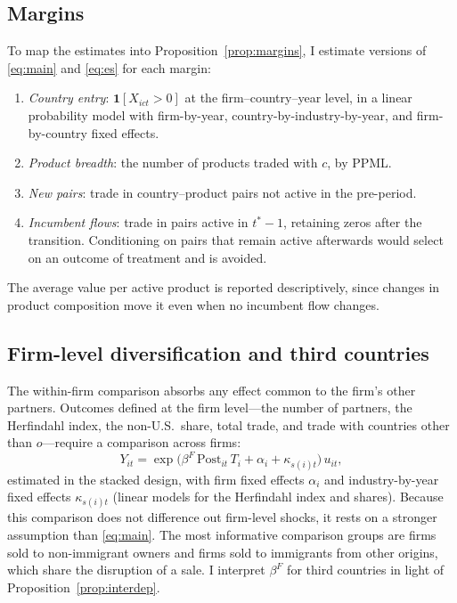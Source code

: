 \documentclass[12pt]{article}
\theoremstyle{remark}
\newcommand{\Post}{\mathrm{Post}}
\newcommand{\one}{\mathbf{1}}
\begin{document}
\subsection{Margins}
\label{sec:margins}

To map the estimates into Proposition~\ref{prop:margins}, I estimate versions
of \eqref{eq:main} and \eqref{eq:es} for each margin:
\begin{enumerate}[label=(\roman*),itemsep=0.1em]
\item \emph{Country entry}: $\one[X_{ict}>0]$ at the firm--country--year level,
in a linear probability model with firm-by-year, country-by-industry-by-year,
and firm-by-country fixed effects.
\item \emph{Product breadth}: the number of products traded with $c$, by
PPML.
\item \emph{New pairs}: trade in country--product pairs not active in the
pre-period.
\item \emph{Incumbent flows}: trade in pairs active in $t^*-1$, retaining zeros
after the transition. Conditioning on pairs that remain active afterwards
would select on an outcome of treatment and is avoided.
\end{enumerate}
The average value per active product is reported descriptively, since
changes in product composition move it even when no incumbent flow changes.

\subsection{Firm-level diversification and third countries}

The within-firm comparison absorbs any effect common to the firm's other
partners. Outcomes defined at the firm level---the number of partners, the
Herfindahl index, the non-U.S.\ share, total trade, and trade with countries
other than $o$---require a comparison across firms:
\begin{equation}
Y_{it} = \exp\big(\beta^{F}\,\Post_{it}\,T_i + \alpha_i + \kappa_{s(i)t}\big)\,u_{it},
\label{eq:firm}
\end{equation}
estimated in the stacked design, with firm fixed effects $\alpha_i$ and
industry-by-year fixed effects $\kappa_{s(i)t}$ (linear models for the
Herfindahl index and shares). Because this comparison does not difference out
firm-level shocks, it rests on a stronger assumption than \eqref{eq:main}. The
most informative comparison groups are firms sold to non-immigrant owners and
firms sold to immigrants from other origins, which share the disruption of a
sale. I interpret $\beta^{F}$ for third countries in light of
Proposition~\ref{prop:interdep}.
\end{document}
